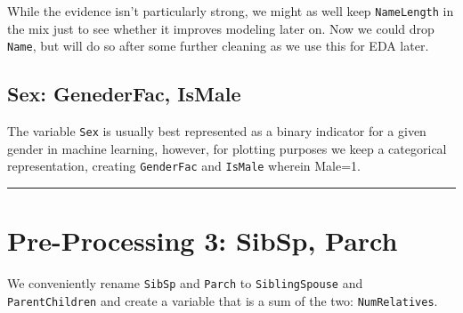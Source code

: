 \documentclass[]{article}
\newenvironment{Shaded}{\begin{snugshade}}{\end{snugshade}}
\newcommand{\KeywordTok}[1]{\textcolor[rgb]{0.13,0.29,0.53}{\textbf{#1}}}
\newcommand{\DecValTok}[1]{\textcolor[rgb]{0.00,0.00,0.81}{#1}}
\newcommand{\StringTok}[1]{\textcolor[rgb]{0.31,0.60,0.02}{#1}}
\newcommand{\CommentTok}[1]{\textcolor[rgb]{0.56,0.35,0.01}{\textit{#1}}}
\newcommand{\OtherTok}[1]{\textcolor[rgb]{0.56,0.35,0.01}{#1}}
\newcommand{\OperatorTok}[1]{\textcolor[rgb]{0.81,0.36,0.00}{\textbf{#1}}}
\newcommand{\NormalTok}[1]{#1}
\begin{document}
While the evidence isn't particularly strong, we might as well keep
\texttt{NameLength} in the mix just to see whether it improves modeling
later on. Now we could drop \texttt{Name}, but will do so after some
further cleaning as we use this for EDA later.

\subsection{Sex: GenederFac, IsMale}\label{sex-genederfac-ismale}

The variable \texttt{Sex} is usually best represented as a binary
indicator for a given gender in machine learning, however, for plotting
purposes we keep a categorical representation, creating
\texttt{GenderFac} and \texttt{IsMale} wherein Male=1.

\begin{Shaded}
\end{Shaded}

\begin{center}\rule{0.5\linewidth}{\linethickness}\end{center}

\hypertarget{preprocess3-link}{\section{Pre-Processing 3: SibSp,
Parch}\label{preprocess3-link}}

We conveniently rename \texttt{SibSp} and \texttt{Parch} to
\texttt{SiblingSpouse} and \texttt{ParentChildren} and create a variable
that is a sum of the two: \texttt{NumRelatives}.
\end{document}
